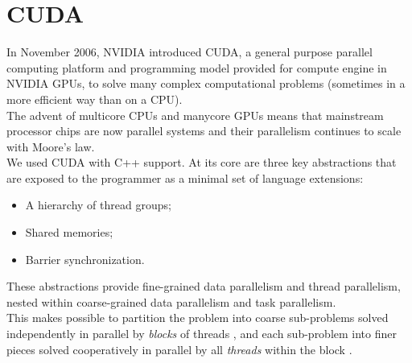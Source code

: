 \section{CUDA}
	In November 2006, NVIDIA introduced CUDA, a general purpose parallel computing platform and programming model provided for compute engine in NVIDIA GPUs, to solve many complex computational problems (sometimes in a more efficient way than on a CPU).\\
	
	The advent of multicore CPUs and manycore GPUs means that mainstream processor chips are now parallel systems and their parallelism continues to scale with Moore's law.\\
	We used CUDA with C++ support.
	At its core are three key abstractions that are exposed to the programmer as a minimal
	set of language extensions:
	\begin{itemize}
		\item A hierarchy of thread groups;
		
		\item Shared memories;
		
		\item Barrier synchronization.
	\end{itemize} 
	
	These abstractions provide fine-grained data parallelism and thread parallelism, nested within coarse-grained data parallelism and task parallelism.\\
	This makes possible to partition the problem into coarse sub-problems \textendash solved independently in parallel by \textit{blocks} of threads \textendash, and each sub-problem into finer pieces \textendash solved cooperatively in parallel by all \textit{threads} within the block \textendash.
	
